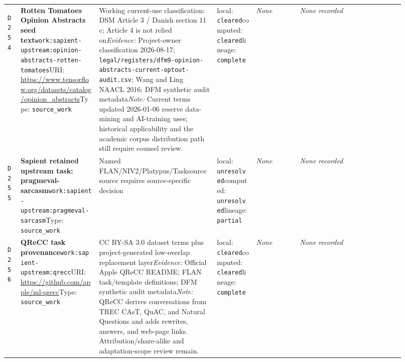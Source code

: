 \documentclass[9pt,a4paper]{article}
\newcommand{\depid}[1]{\hypertarget{dep:#1}{\texttt{#1}}}
\begin{document}
\begin{landscape}
\begin{longtable}{@{}L{0.035\linewidth}L{0.185\linewidth}L{0.27\linewidth}L{0.09\linewidth}L{0.10\linewidth}L{0.24\linewidth}@{}}
\depid{D254} & \textbf{Rotten Tomatoes Opinion Abstracts seed text}\newline \nolinkurl{work:sapient-upstream:opinion-abstracts-rotten-tomatoes}\newline URI: \url{https://www.tensorflow.org/datasets/catalog/opinion_abstracts}\newline Type: \texttt{source\_work} & Working current-use classification: DSM Article 3 / Danish section 11 c; Article 4 is not relied on\newline \textit{Evidence:} Project-owner classification 2026-08-17; \nolinkurl{legal/registers/dfm9-opinion-abstracts-current-optout-audit.csv}; Wang and Ling NAACL 2016; DFM synthetic audit metadata\newline \textit{Note:} Current terms updated 2026-01-06 reserve data-mining and AI-training uses; historical applicability and the academic corpus distribution path still require counsel review. & local: \texttt{cleared}\newline computed: \texttt{cleared}\newline lineage: \texttt{complete} & \textit{None} & \textit{None recorded} \\
\depid{D255} & \textbf{Sapient retained upstream task: pragmeval-sarcasm}\newline \nolinkurl{work:sapient-upstream:pragmeval-sarcasm}\newline Type: \texttt{source\_work} & Named FLAN/NIV2/Platypus/Tasksource source requires source-specific decision & local: \texttt{unresolved}\newline computed: \texttt{unresolved}\newline lineage: \texttt{partial} & \textit{None} & \textit{None recorded} \\
\depid{D256} & \textbf{QReCC task provenance}\newline \nolinkurl{work:sapient-upstream:qrecc}\newline URI: \url{https://github.com/apple/ml-qrecc}\newline Type: \texttt{source\_work} & CC BY-SA 3.0 dataset terms plus project-generated low-overlap replacement layer\newline \textit{Evidence:} Official Apple QReCC README; FLAN task/template definitions; DFM synthetic audit metadata\newline \textit{Note:} QReCC derives conversations from TREC CAsT, QuAC, and Natural Questions and adds rewrites, answers, and web-page links. Attribution/share-alike and adaptation-scope review remain. & local: \texttt{cleared}\newline computed: \texttt{cleared}\newline lineage: \texttt{complete} & \textit{None} & \textit{None recorded} \\

\end{longtable}
\end{landscape}
\end{document}

